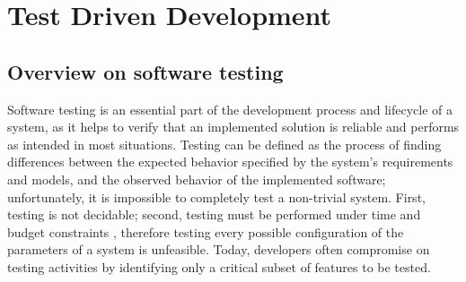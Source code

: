 \chapter{Test Driven Development}
\section{Overview on software testing}
Software testing is an essential part of the development process and lifecycle of a system, as it helps to verify that an implemented solution is reliable and performs as intended in most situations. Testing can be defined as the process of finding differences between the expected behavior specified by the system's requirements and models, and the observed behavior of the implemented software; unfortunately, it is impossible to completely test a non-trivial system. First, testing is not decidable; second, testing must be performed under time and budget constraints \cite{OOSE}, therefore testing every possible configuration of the parameters of a system is unfeasible.
Today, developers often compromise on testing activities by identifying only a critical subset of features to be tested.


